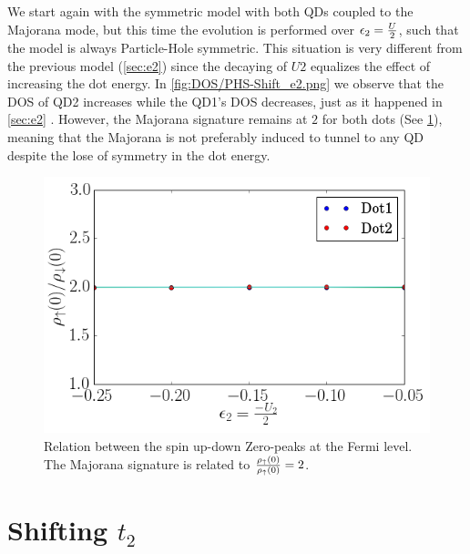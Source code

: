We start again with the symmetric model with both QDs coupled to the Majorana mode, but this time the evolution is performed over $\epsilon_2=\frac{U}{2}$, such that the model is always Particle-Hole symmetric. This situation is very different from the previous model (\ref{sec:e2}) since the decaying of $U2$ 
equalizes the effect of increasing the dot energy. In \ref{fig:DOS/PHS-Shift_e2.png} we observe that the DOS of QD2 increases while the QD1's DOS decreases, just as it happened in \ref{sec:e2} . However, the Majorana signature remains at $2$ for both dots (See \ref{fig:MSig/PHS-Shift_e2}), meaning that the Majorana is not preferably induced to tunnel to any QD despite the lose of symmetry in the dot energy.

\begin{figure}[hbt]
\centering
\includegraphics[scale=0.4]{Plots/MSig/PHS-Shift_e2.png}
\caption{\label{fig:MSig/PHS-Shift_e2} Relation between the spin up-down Zero-peaks at the Fermi level. The Majorana signature is related to $\frac{\rho_\uparrow(0)}{\rho_\uparrow(0)}=2$.}
\end{figure}

\section{Shifting $t_2$}


